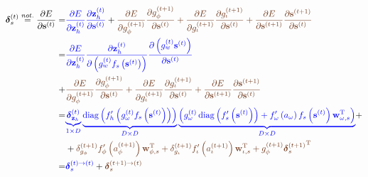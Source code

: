 \documentclass[11pt]{article}
\DeclareMathOperator{\diag}{diag}
\begin{document}
\begin{equation}
  \begin{split}
    \boldsymbol{\delta}_{s}^{(t)} \overset{not.}{=} \dfrac{\partial
      E}{\partial \mathbf{s}^{(t)}} = & {\color{blue}
      \dfrac{\partial E}{\partial \mathbf{z}_h^{(t)}}
      \dfrac{\partial \mathbf{z}_h^{(t)}}{\partial
        \mathbf{s}^{(t)}}} + {\color{auburn}\dfrac{\partial
        E}{\partial g_{\phi}^{(t+1)}} \dfrac{\partial
        g_{\phi}^{(t+1)}}{\partial \mathbf{s}^{(t)}} +
      \dfrac{\partial E}{\partial g_{\iota}^{(t+1)}} \dfrac{\partial
        g_{\iota}^{(t+1)}}{\partial \mathbf{s}^{(t)}} +
      \dfrac{\partial E}{\partial \mathbf{s}^{(t+1)}}
      \dfrac{\partial \mathbf{s}^{(t+1)}}{\partial
        \mathbf{s}^{(t)}}}
    \\
    = & {\color{blue}
      \dfrac{\partial E}{\partial \mathbf{z}_h^{(t)}}
      \dfrac{\partial \mathbf{z}_h^{(t)}}{\partial
        \left(g_w^{(t)} f_s \left(\mathbf{s}^{(t)} \right) \right)}
      \dfrac{\partial
        \left(g_w^{(t)} \mathbf{s}^{(t)} \right)}
      {\partial \mathbf{s}^{(t)}}
    } \\ + & {\color{auburn}\dfrac{\partial
      E}{\partial g_{\phi}^{(t+1)}} \dfrac{\partial
      g_{\phi}^{(t+1)}}{\partial \mathbf{s}^{(t)}} +
    \dfrac{\partial E}{\partial g_{\iota}^{(t+1)}} \dfrac{\partial
      g_{\iota}^{(t+1)}}{\partial \mathbf{s}^{(t)}} +
    \dfrac{\partial E}{\partial \mathbf{s}^{(t+1)}}
    \dfrac{\partial \mathbf{s}^{(t+1)}}{\partial
      \mathbf{s}^{(t)}}}
  \\
  = & {\color{blue}
    \underbrace{\boldsymbol{\delta}_{\mathbf{z}_h}^{(t)}}_{1\times D}
    \underbrace{\diag\left(f_{h}'\left(g_{\omega}^{(t)} f_s\left(\mathbf{s}^{(t)}\right)\right)\right)}_{D\times D}
    \underbrace{\left( g_{\omega}^{(t)} \diag\left(f_s'\left(\mathbf{s}^{(t)}\right) \right) + f'_{\omega}\left(a_{\omega} \right) f_s\left(\mathbf{s}^{(t)}\right)\mathbf{w}^{\text{T}}_{\omega, s} \right) }_{D \times D}} + \\
     & +
     {\color{auburn}\delta_{g_{\phi}}^{(t+1)}f_{\phi}'\left(a_{\phi}^{(t+1)}\right)\mathbf{w}_{\phi,
         s}^{\text{T}} +
       \delta_{g_{\iota}}^{(t+1)}f_{\iota}'\left(a_{\iota}^{(t+1)}\right)\mathbf{w}_{\iota,
         s}^{\text{T}} +
       g_{\phi}^{(t+1)}{\boldsymbol{\delta}_{s}^{(t+1)}}^{\text{T}}} \\
     = & {\color{blue}\boldsymbol{\delta}^{(t) \rightarrow (t)}_s} +
     {\color{auburn}\boldsymbol{\delta}^{(t+1) \rightarrow (t)}_s}
  \end{split}
\end{equation}
\end{document}
